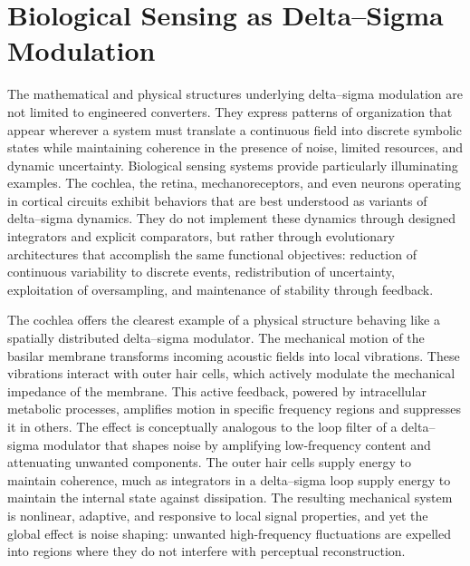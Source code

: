 
\chapter{Biological Sensing as Delta–Sigma Modulation}

The mathematical and physical structures underlying delta–sigma modulation are not limited to engineered converters. They express patterns of organization that appear wherever a system must translate a continuous field into discrete symbolic states while maintaining coherence in the presence of noise, limited resources, and dynamic uncertainty. Biological sensing systems provide particularly illuminating examples. The cochlea, the retina, mechanoreceptors, and even neurons operating in cortical circuits exhibit behaviors that are best understood as variants of delta–sigma dynamics. They do not implement these dynamics through designed integrators and explicit comparators, but rather through evolutionary architectures that accomplish the same functional objectives: reduction of continuous variability to discrete events, redistribution of uncertainty, exploitation of oversampling, and maintenance of stability through feedback.

The cochlea offers the clearest example of a physical structure behaving like a spatially distributed delta–sigma modulator. The mechanical motion of the basilar membrane transforms incoming acoustic fields into local vibrations. These vibrations interact with outer hair cells, which actively modulate the mechanical impedance of the membrane. This active feedback, powered by intracellular metabolic processes, amplifies motion in specific frequency regions and suppresses it in others. The effect is conceptually analogous to the loop filter of a delta–sigma modulator that shapes noise by amplifying low-frequency content and attenuating unwanted components. The outer hair cells supply energy to maintain coherence, much as integrators in a delta–sigma loop supply energy to maintain the internal state against dissipation. The resulting mechanical system is nonlinear, adaptive, and responsive to local signal properties, and yet the global effect is noise shaping: unwanted high-frequency fluctuations are expelled into regions where they do not interfere with perceptual reconstruction.


